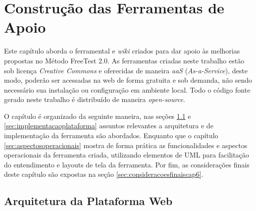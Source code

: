 \chapter{Construção das Ferramentas de Apoio}
\label{sec:ferramentas}

Este capítulo aborda o ferramental e \textit{wiki} criados para dar apoio às melhorias propostas no Método FreeTest 2.0. As ferramentas criadas neste trabalho estão sob licença \textit{Creative Commons} e oferecidas de maneira \textit{aaS} (\textit{As-a-Service}), deste modo, poderão ser acessadas na web de forma gratuita e sob demanda, não sendo necessário sua instalação ou configuração em ambiente local. Todo o código fonte gerado neste trabalho é distribuído de maneira \textit{open-source}. 

O capítulo é organizado da seguinte maneira, nas seções \ref{sec:arquiteturaplataforma} e \ref{sec:implementacaoplataforma} assuntos relevantes a arquitetura e de implementação da ferramenta são abordados. Enquanto que o capítulo \ref{sec:aspectosoperacionais} mostra de forma prática as funcionalidades e aspectos operacionais da ferramenta criada, utilizando elementos de UML para facilitação do entendimento e layouts de tela da ferramenta. Por fim, as considerações finais deste capítulo são expostas na seção \ref{sec:consideracoesfinaiscap6}.

\section{Arquitetura da Plataforma Web}
\label{sec:arquiteturaplataforma}

